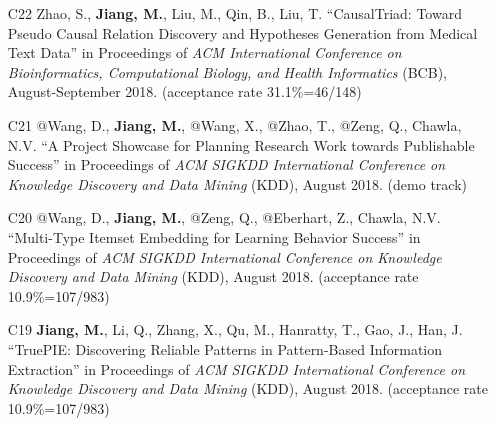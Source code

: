 \documentclass[10pt]{article}
\newenvironment{myindentpar}[1]%
{\begin{list}{}%
         {\setlength{\leftmargin}{#1}}%
         \item[]%
}
{\end{list}}
\newcounter{list}
\newcommand{\hide}[1]{}
\begin{document}
\begin{myindentpar}{0.00cm}
\begin{enumerate}[leftmargin=.5cm]
	\hide{\vspace{-0.1cm}\hspace{0.5cm}{\small \emph{I made 3\% contribution. Mr. Ding conceived the idea in consultation with myself. Mr. Ding implemented the system, completed the experiments, and wrote the paper.}}}

\item[C22] Zhao, S., \textbf{Jiang, M.}, Liu, M., Qin, B., Liu, T. ``CausalTriad: Toward Pseudo Causal Relation Discovery and Hypotheses Generation from Medical Text Data'' in Proceedings of \emph{ACM International Conference on Bioinformatics, Computational Biology, and Health Informatics} (BCB), August-September 2018. (acceptance rate 31.1\%=46/148)

	\hide{\vspace{-0.1cm}\hspace{0.5cm}{\small \emph{I made 20\% contribution. Mr. Zhao conceived the idea in consultation with myself. Mr. Zhao implemented the system, completed the experiments, and wrote the paper.}}}

\item[C21] @Wang, D., \textbf{Jiang, M.}, @Wang, X., @Zhao, T., @Zeng, Q., Chawla, N.V. ``A Project Showcase for Planning Research Work towards Publishable Success'' in Proceedings of \emph{ACM SIGKDD International Conference on Knowledge Discovery and Data Mining} (KDD), August 2018. (demo track)

	\hide{\vspace{-0.1cm}\hspace{0.5cm}{\small \emph{I made 20\% contribution. I conceived the idea. Mr. Wang implemented the system, did the experiments, and wrote the paper.}}}

\item[C20] @Wang, D., \textbf{Jiang, M.}, @Zeng, Q., @Eberhart, Z., Chawla, N.V. ``Multi-Type Itemset Embedding for Learning Behavior Success'' in Proceedings of \emph{ACM SIGKDD International Conference on Knowledge Discovery and Data Mining} (KDD), August 2018. (acceptance rate 10.9\%=107/983)

	\hide{\vspace{-0.1cm}\hspace{0.5cm}{\small \emph{I made 70\% contribution and Mr. Wang made 20\%. I conceived the idea and designed the study. Mr. Wang implemented the system and did the experiments.}}}

\item[C19] \textbf{Jiang, M.}, Li, Q., Zhang, X., Qu, M., Hanratty, T., Gao, J., Han, J. ``TruePIE: Discovering Reliable Patterns in Pattern-Based Information Extraction'' in Proceedings of \emph{ACM SIGKDD International Conference on Knowledge Discovery and Data Mining} (KDD), August 2018. (acceptance rate 10.9\%=107/983)


\end{enumerate}
\end{myindentpar}
\end{document}

